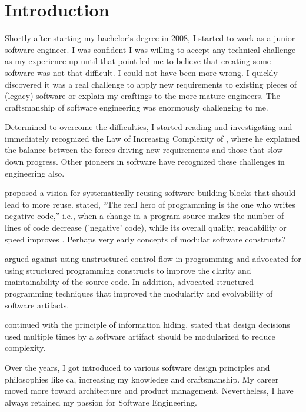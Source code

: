 \chapter{Introduction} \label{chap_introduction}

Shortly after starting my bachelor's degree in 2008, I started to work as a junior
software engineer. I was confident I was willing to accept any technical challenge as my
experience up until that point led me to believe that creating some software was not that
difficult. I could not have been more wrong. I quickly discovered it was a real challenge
to apply new requirements to existing pieces of (legacy) software or explain my craftings
to the more mature engineers. The craftsmanship of software engineering was enormously
challenging to me.

Determined to overcome the difficulties, I started reading and investigating and
immediately recognized the Law of Increasing Complexity of
\textcite{lehman_programs_1980}, where he explained the balance between the forces driving
new requirements and those that slow down progress. Other pioneers in software have
recognized these challenges in engineering also.


\textcite{d_mcilroy_nato_1968} proposed a vision for systematically reusing software building
blocks that should lead to more reuse. \textcite{d_mcilroy_nato_1968} stated, \enquote{The real
hero of programming is the one who writes negative code,} i.e., when a change in a program
source makes the number of lines of code decrease ('negative' code), while its overall
quality, readability or speed improves \parencite{wikipedia_douglas_2023}. Perhaps very
early concepts of modular software constructs?

\textcite{dijkstra_letters_1968} argued against using unstructured control flow in
programming and advocated for using structured programming constructs to improve the
clarity and maintainability of the source code. In addition,
 advocated structured programming techniques that
improved the modularity and evolvability of software artifacts.

\textcite{parnas_criteria_1972} continued with the principle of information hiding.
 stated that design decisions used multiple times by a
software artifact should be modularized to reduce complexity. 

Over the years, I got introduced to various software design principles and philosophies
like \gls{ca}, increasing my knowledge and craftsmanship. My career moved more toward
architecture and product management. Nevertheless, I have always retained my passion for
Software Engineering.

